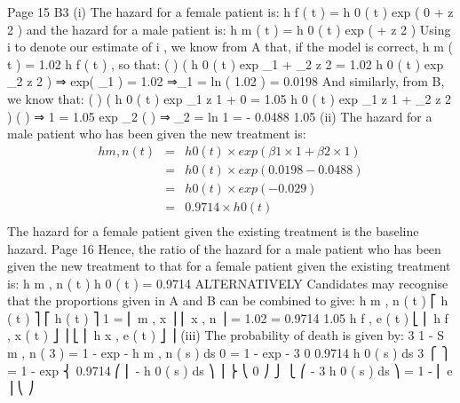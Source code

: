 \documentclass[a4paper,12pt]{article}
\begin{document}
Page 15
B3
(i)
The hazard for a female patient is:
h f ( t ) = h 0 ( t ) \times exp ( 0 +  z 2 )
and the hazard for a male patient is:
h m ( t ) = h 0 ( t ) \times exp (   +  z 2 )
Using \hat{\beta} i to denote our estimate of \beta i , we know from A that, if the model is
correct,
h m ( t ) = 1.02 \times h f ( t ) , so that:
(
)
(
h 0 ( t ) \times exp \hat{\beta}_{1} + \hat{\beta}_{2} z 2 = 1.02 \times h 0 ( t ) \times exp \hat{\beta}_{2} z 2
)
⇒ exp( \hat{\beta}_{1} ) = 1.02
⇒\hat{\beta}_{1} = ln ( 1.02 ) = 0.0198
And similarly, from B, we know that:
(
)
(
h 0 ( t ) \times exp \hat{\beta}_{1} z 1 + 0 = 1.05 \times h 0 ( t ) \times exp \hat{\beta}_{1} z 1 + \hat{\beta}_{2} z 2
)
( )
⇒ 1 = 1.05 \times exp \hat{\beta}_{2}
(
)
⇒ \hat{\beta}_{2} = ln 1
= - 0.0488
1.05
(ii)
The hazard for a male patient who has been given the new treatment is:
\begin{eqnarray*}
h m , n ( t ) 
&=& h 0 ( t ) \times exp ( \beta 1 \times 1 + \beta 2 \times 1 )\\
&=& h 0 ( t ) \times exp ( 0.0198 - 0.0488 )\\
&=& h 0 ( t ) \times exp ( - 0.029 )\\
&=& 0.9714 \times h 0 ( t )\\
\end{eqnarray*}
The hazard for a female patient given the existing treatment is the baseline
hazard.
Page 16
Hence, the ratio of the hazard for a male patient who has been given the new
treatment to that for a female patient given the existing treatment is:
h m , n ( t )
h 0 ( t )
= 0.9714
ALTERNATIVELY
Candidates may recognise that the proportions given in A and B can be
combined to give:
h m , n ( t )
⎡ h ( t ) ⎤ ⎡ h ( t ) ⎤
1
= ⎢ m , x ⎥ \times ⎢ x , n ⎥ = 1.02 \times
= 0.9714
1.05
h f , e ( t ) ⎣ ⎢ h f , x ( t ) ⎦ ⎥ ⎣ ⎢ h x , e ( t ) ⎦ ⎥
(iii)
The probability of death is given by:
{
{ \int 
}
3
1 - S m , n ( 3 ) = 1 - exp - \int  h m , n ( s ) ds
0
= 1 - exp -
3
0
}
0.9714 \times h 0 ( s ) ds
3
⎧
⎫
= 1 - exp ⎨ 0.9714 \times ⎛ ⎜ - \int  h 0 ( s ) ds ⎞ ⎟ ⎬
⎝ 0
⎠ ⎭
⎩
⎛ -  3 h 0 ( s ) ds ⎞
= 1 - ⎜ e
⎟
⎝
⎠
\end{document}
